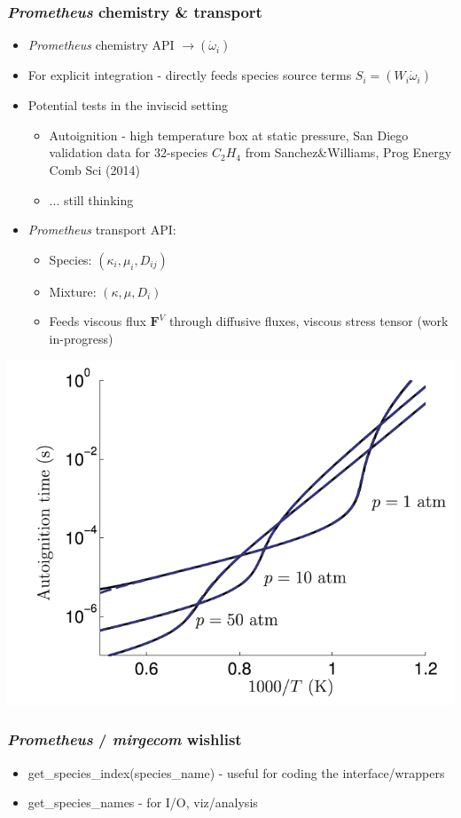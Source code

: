\begin{frame}\frametitle{\textit{Prometheus} chemistry \& transport}
\begin{multicols}{2}
\begin{itemize}
\item \textit{Prometheus} chemistry API $\rightarrow (\dot{\omega}_i)$
\item For explicit integration - directly feeds species source terms $S_i = (W_i \dot{\omega}_i)$
\item Potential tests in the inviscid setting
\begin{itemize}
  \item Autoignition - high temperature box at static pressure, San Diego validation data for 32-species $C_{2}H_{4}$ from Sanchez\&Williams, Prog Energy Comb Sci (2014) 
  \item ... still thinking
\end{itemize}
\item \textit{Prometheus} transport API:
   \begin{itemize}
      \item Species:  $(\kappa_i, \mu_i, D_{ij})$
      \item Mixture: $(\kappa, \mu, D_i)$
      \item Feeds viscous flux $\mathbf{F}^V$ through diffusive fluxes, viscous stress tensor (work in-progress)
   \end{itemize}
\end{itemize}
\includegraphics[width=.4\textwidth]{figures/autoignition.png}
\end{multicols}
\end{frame}

\begin{frame}\frametitle{\textit{Prometheus} / \textit{mirgecom} wishlist}
\begin{itemize}
   \item get\_species\_index(species\_name) - useful for coding the interface/wrappers
   \item get\_species\_names - for I/O, viz/analysis
\end{itemize}           
\end{frame}

